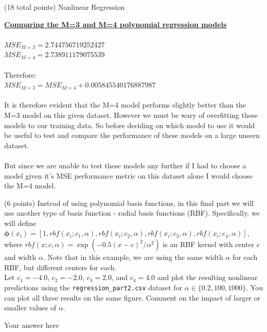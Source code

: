 \documentclass[12pt]{article}
\begin{document}
\begin{question}{(18 total points) Nonlinear Regression}
\begin{subquestion}
\begin{answerbox}{23em}
\large{\textbf{\underline{Comparing the M=3 and M=4 polynomial regression models}}}\\
\\
\normalsize{
$MSE_{M=3} = 2.744756719252427$\\
$MSE_{M=4} = 2.738911179075539$\\
\\
Therefore:\\
$MSE_{M=3} = MSE_{M=4} + 0.005845540176887987$\\
\\
It is therefore evident that the M=4 model performs slightly better than the M=3 model on this given dataset. However we must be wary of overfitting these models to our training data. So before deciding on which model to use it would be useful to test and compare the performance of these models on a large unseen dataset.\\
\\
But since we are unable to test these models any further if I had to choose a model given it's MSE performance metric on this dataset alone I would choose the M=4 model.
}
\end{answerbox}



\end{subquestion}



%
%
\begin{subquestion}{(6 points) Instead of using polynomial basis functions, in this final part we will use another type of basis function - radial basis functions (RBF). 
Specifically, we will define $\boldsymbol{\phi}(x_i) = [1, rbf(x_i; c_1, \alpha), rbf(x_i; c_2, \alpha), rbf(x_i; c_3, \alpha), rbf(x_i; c_4, \alpha)]$, where $rbf(x; c, \alpha) =  \exp(-0.5(x-c)^2 / \alpha^2)$ is an RBF kernel with center $c$ and width $\alpha$. Note that in this example, we are using the same width $\alpha$ for each RBF, but different centers for each.\\ 
Let $c_1=-4.0$, $c_2=-2.0$, $c_3=2.0$, and $c_4=4.0$ and plot the resulting nonlinear predictions using the \texttt{regression\_part2.csv} dataset for $\alpha \in \{0.2, 100, 1000\}$. 
You can plot all three results on the same figure.
Comment on the impact of larger or smaller values of $\alpha$.
}


\begin{answerbox}{35em}
Your answer here
\end{answerbox}



\end{subquestion}



\end{question}
\end{document}
